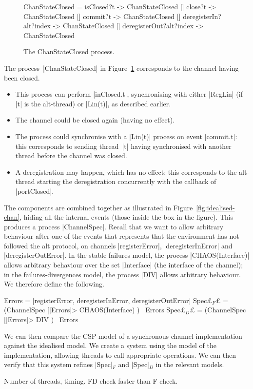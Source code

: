 
\begin{figure}
\begin{cspm}
ChanStateClosed = 
  isClosed?t -> ChanStateClosed
  [] close?t -> ChanStateClosed
  [] commit?t -> ChanStateClosed
  [] deregisterIn?alt?index -> ChanStateClosed
  [] deregisterOut?alt?index -> ChanStateClosed
\end{cspm}
\caption{The {\scalashape ChanStateClosed}
  process.  \label{fig:ChanStateClosed}}
\end{figure}


The process~|ChanStateClosed| in Figure~\ref{fig:ChanStateClosed} corresponds
to the channel having been closed.  
%
\begin{itemize}
\item This process can perform |inClosed.t|, synchronising with either
  |RegLin| (if |t| is the alt-thread) or |Lin(t)|, as described earlier.

\item The channel could be closed again (having no effect).

\item The process could synchronise with a |Lin(t)| process on event
  |commit.t|: this corresponds to sending thread~|t| having synchronised with
  another thread before the channel was closed. 

\item A deregistration may happen, which has no effect: this corresponds to
  the alt-thread starting the deregistration concurrently with the callback of
  |portClosed|. 
\end{itemize}

The components are combined together as illustrated in
Figure~\ref{fig:idealised-chan}, hiding all the internal events (those inside
the box in the figure).  This produces a process |ChannelSpec|.  Recall that
we want to allow arbitrary behaviour after one of the events that represents
that the environment has not followed the alt protocol, on channels
|registerError|, |deregisterInError| and |deregisterOutError|.  In the
stable-failures model, the process |CHAOS(Interface)| allows arbitrary
behaviour over the set |Interface| (the interface of the channel); in the
failures-divergences model, the process |DIV| allows arbitrary behaviour.  We
therefore define the following. 
%
\begin{cspm}
Errors = {|registerError, deregisterInError, deregisterOutError|}
Spec£$_F$£ = (ChannelSpec [|Errors|> CHAOS(Interface) ) \ Errors
Spec£$_D$£ = (ChannelSpec [|Errors|> DIV ) \ Errors
\end{cspm}

We can then compare the CSP model of a synchronous channel implementation
against the idealised model.  We create a system using the model of the
implementation, allowing threads to call appropriate operations.  We can then
verify that this system refines |Spec|$_F$ and |Spec|$_D$ in the relevant
models. 

\framebox{**} Number of threads, timing.  FD check faster than F check. 

 
